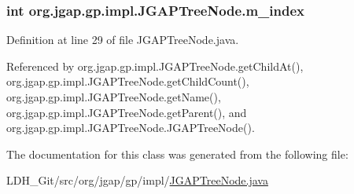 \hypertarget{classorg_1_1jgap_1_1gp_1_1impl_1_1_j_g_a_p_tree_node_a2fea7816f54f4a14a8ed20e20d7083d8}{
\subsubsection[{m\-\_\-index}]{\setlength{\rightskip}{0pt plus 5cm}int org.\-jgap.\-gp.\-impl.\-J\-G\-A\-P\-Tree\-Node.\-m\-\_\-index\hspace{0.3cm}{\ttfamily [private]}}}\label{classorg_1_1jgap_1_1gp_1_1impl_1_1_j_g_a_p_tree_node_a2fea7816f54f4a14a8ed20e20d7083d8}


Definition at line 29 of file J\-G\-A\-P\-Tree\-Node.\-java.



Referenced by org.\-jgap.\-gp.\-impl.\-J\-G\-A\-P\-Tree\-Node.\-get\-Child\-At(), org.\-jgap.\-gp.\-impl.\-J\-G\-A\-P\-Tree\-Node.\-get\-Child\-Count(), org.\-jgap.\-gp.\-impl.\-J\-G\-A\-P\-Tree\-Node.\-get\-Name(), org.\-jgap.\-gp.\-impl.\-J\-G\-A\-P\-Tree\-Node.\-get\-Parent(), and org.\-jgap.\-gp.\-impl.\-J\-G\-A\-P\-Tree\-Node.\-J\-G\-A\-P\-Tree\-Node().



The documentation for this class was generated from the following file\-:\begin{DoxyCompactItemize}
\item 
L\-D\-H\-\_\-\-Git/src/org/jgap/gp/impl/\hyperlink{_j_g_a_p_tree_node_8java}{J\-G\-A\-P\-Tree\-Node.\-java}\end{DoxyCompactItemize}
